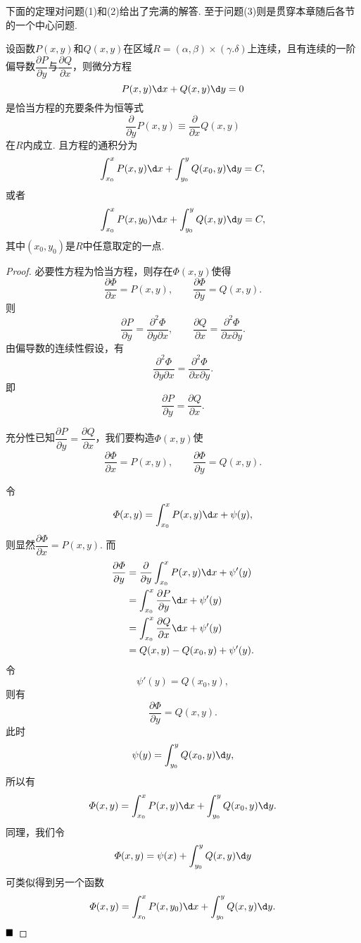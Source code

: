 \documentclass[lang=cn,10pt]{elegantbook}
\begin{document}
下面的定理对问题(1)和(2)给出了完满的解答. 至于问题(3)则是贯穿本章随后各节的一个中心问题.
\begin{theorem}
	设函数$P(x,y)$和$Q(x,y)$在区域$R=(\alpha,\beta)\times(\gamma.\delta)$上连续，且有连续的一阶偏导数$\dfrac{\partial P}{\partial y}$与$\dfrac{\partial Q}{\partial x}$，则微分方程
	$$P(x,y)\d x+Q(x,y)\d y=0$$
	是恰当方程的充要条件为恒等式
	$$\frac{\partial}{\partial y}P(x,y)\equiv\frac{\partial}{\partial x}Q(x,y)$$
	在$R$内成立. 且方程的通积分为
	$$\int_{x_0}^{x}P(x,y)\d x+\int_{y_0}^{y}Q(x_0,y)\d y=C,$$
	或者
	$$\int_{x_0}^{x}P(x,y_0)\d x+\int_{y_0}^{y}Q(x,y)\d y=C,$$
	其中$(x_0,y_0)$是$R$中任意取定的一点.
\end{theorem}
\begin{proof}
	{\heiti 必要性}\qquad 方程为恰当方程，则存在$\varPhi(x,y)$使得
	$$\frac{\partial\varPhi}{\partial x}=P(x,y),\qquad\frac{\partial\varPhi}{\partial y}=Q(x,y).$$
	则
	$$\frac{\partial P}{\partial y}=\frac{\partial^2\varPhi}{\partial y\partial x},\qquad\frac{\partial Q}{\partial x}=\frac{\partial^2\varPhi}{\partial x\partial y}.$$
	由偏导数的连续性假设，有
	$$\frac{\partial^2\varPhi}{\partial y\partial x}=\frac{\partial^2\varPhi}{\partial x\partial y}.$$
	即
	$$\frac{\partial P}{\partial y}=\frac{\partial Q}{\partial x}.$$
	
	{\heiti 充分性}\qquad 已知$\dfrac{\partial P}{\partial y}=\dfrac{\partial Q}{\partial x}$，我们要构造$\varPhi(x,y)$使
	$$\frac{\partial\varPhi}{\partial x}=P(x,y),\qquad\frac{\partial\varPhi}{\partial y}=Q(x,y).$$
	
	令
	$$\varPhi(x,y)=\int_{x_0}^{x}P(x,y)\d x+\psi(y),$$
	则显然$\dfrac{\partial\varPhi}{\partial x}=P(x,y)$.
	而
	\begin{align*}
		\frac{\partial \varPhi}{\partial y}
		&=\frac{\partial}{\partial y}\int_{x_0}^{x}P(x,y)\d x+\psi'(y)\\
		&=\int_{x_0}^{x}\frac{\partial P}{\partial y}\d x+\psi'(y)\\
		&=\int_{x_0}^{x}\frac{\partial Q}{\partial x}\d x+\psi'(y)\\
		&=Q(x,y)-Q(x_0,y)+\psi'(y).
	\end{align*}
	令
	$$\psi'(y)=Q(x_0,y),$$
	则有
	$$\frac{\partial\varPhi}{\partial y}=Q(x,y).$$
	此时
	$$\psi(y)=\int_{y_0}^{y}Q(x_0,y)\d y,$$
	所以有
	$$\varPhi(x,y)=\int_{x_0}^{x}P(x,y)\d x+\int_{y_0}^{y}Q(x_0,y)\d y.$$
	同理，我们令
	$$\varPhi(x,y)=\psi(x)+\int_{y_0}^{y}Q(x,y)\d y$$
	可类似得到另一个函数
	$$\varPhi(x,y)=\int_{x_0}^{x}P(x,y_0)\d x+\int_{y_0}^{y}Q(x,y)\d y.$$
	$\hfill\blacksquare$
\end{proof}
\end{document}
